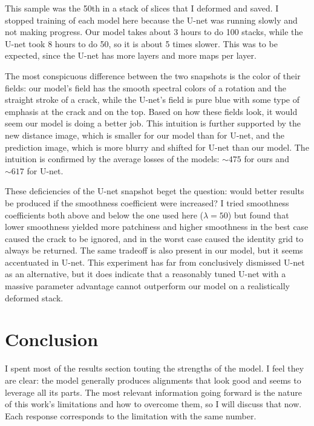 \documentclass[12pt,a4paper]{article}
\begin{document}
\newpage

This sample was the 50th in a stack of slices that I deformed and saved. I stopped training of each model here because the U-net was running slowly and not making progress. Our model takes about 3 hours to do 100 stacks, while the U-net took 8 hours to do 50, so it is about 5 times slower.  This was to be expected, since the U-net has more layers and more maps per layer.

The most conspicuous difference between the two snapshots is the color of their fields: our model's field has the smooth spectral colors of a rotation and the straight stroke of a crack, while the U-net's field is pure blue with some type of emphasis at the crack and on the top. Based on how these fields look, it would seem our model is doing a better job. This intuition is further supported by the new distance image, which is smaller for our model than for U-net, and the prediction image, which is more blurry and shifted for U-net than our model. The intuition is confirmed by the average losses of the models: $\sim475$ for ours and $\sim617$ for U-net.

These deficiencies of the U-net snapshot beget the question: would better results be produced if the smoothness coefficient were increased? I tried smoothness coefficients both above and below the one used here ($\lambda = 50$) but found that lower smoothness yielded more patchiness and higher smoothness in the best case caused the crack to be ignored, and in the worst case caused the identity grid to always be returned. The same tradeoff is also present in our model, but it seems accentuated in U-net. This experiment has far from conclusively dismissed U-net as an alternative, but it does indicate that a reasonably tuned U-net with a massive parameter advantage cannot outperform our model on a realistically deformed stack.

\newpage



\section{Conclusion}

I spent most of the results section touting the strengths of the model. I feel they are clear: the model generally produces alignments that look good and seems to leverage all its parts. The most relevant information going forward is the nature of this work's limitations and how to overcome them, so I will discuss that now. Each response corresponds to the limitation with the same number.
\end{document}
